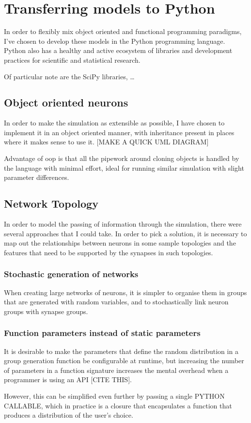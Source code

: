

\section{Transferring models to Python}

In order to flexibly mix object oriented and functional programming paradigms,
I've chosen to develop these models in the Python programming language. Python
also has a healthy and active ecosystem of libraries and development practices
for scientific and statistical research.

Of particular note are the SciPy libraries, \ldots



\subsection{Object oriented neurons}

In order to make the simulation as extensible as possible, I have chosen to
implement it in an object oriented manner, with inheritance present in places
where it makes sense to use it. [MAKE A QUICK UML DIAGRAM]

Advantage of oop is that all the pipework around cloning objects is handled
by the language with minimal effort, ideal for running similar simulation with
slight parameter differences.

\subsection{Network Topology}

In order to model the passing of information through the simulation, there were
several approaches that I could take. In order to pick a solution, it is
necessary to map out the relationships between neurons in some sample topologies
and the features that need to be supported by the synapses in such topologies.

\subsubsection{Stochastic generation of networks}

When creating large networks of neurons, it is simpler to organise them in
groups that are generated with random variables, and to stochastically link
neuron groups with synapse groups. 

\subsubsection{Function parameters instead of static parameters}

It is desirable to make the parameters that define the random distribution in a group
generation function be configurable at runtime, but increasing the number of
parameters in a function signature increases the mental overhead when a programmer is
using an API [CITE THIS]. 

However,
this can be simplified even further by passing a single PYTHON CALLABLE, which
in practice is a closure that encapsulates a function that produces a
distribution of the user's choice. 